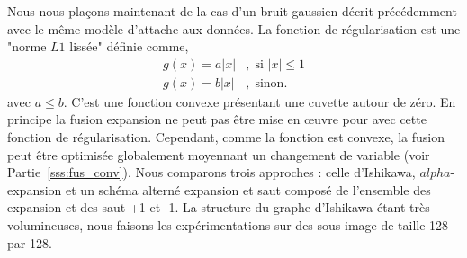 \documentclass[../main/These_Mathias_Paget.tex]{subfiles}
\begin{document}
Nous nous plaçons maintenant de la cas d'un bruit gaussien décrit précédemment avec le même modèle d'attache aux données. La fonction de régularisation est une "norme $L1$ lissée"  définie comme,
\begin{equation}
		\begin{aligned}
				g(x) = a|x| &, \; \text{si } |x| \leq 1 \\
				g(x) = b|x| &, \; \text{sinon}.
		\end{aligned}
\end{equation}
avec $a \leq b$. C'est une fonction convexe présentant une cuvette autour de zéro. En principe la fusion expansion ne peut pas être mise en œuvre pour avec cette fonction de régularisation. Cependant, comme la fonction est convexe, la fusion peut être optimisée globalement moyennant un changement de variable (voir Partie~\ref{sss:fus_conv}). Nous comparons trois approches : celle d'Ishikawa, $alpha$-expansion et un schéma alterné expansion et saut composé de l'ensemble des expansion et des saut +1 et -1. La structure du graphe d'Ishikawa étant très volumineuses, nous faisons les expérimentations sur des sous-image de taille 128 par 128.
\end{document}
